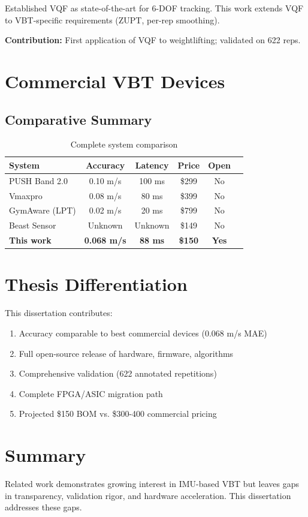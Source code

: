 Established VQF as state-of-the-art for 6-DOF tracking. This work extends VQF to VBT-specific requirements (ZUPT, per-rep smoothing).

\textbf{Contribution:} First application of VQF to weightlifting; validated on 622 reps.

\section{Commercial VBT Devices}

\subsection{Comparative Summary}

\begin{table}[h]
    \centering
    \caption{Complete system comparison}
    \label{tab:system_comparison}
    \begin{tabular}{lccccc}
        \toprule
        \textbf{System} & \textbf{Accuracy} & \textbf{Latency} & \textbf{Price} & \textbf{Open} \\
        \midrule
        PUSH Band 2.0 & 0.10 m/s & 100 ms & \$299 & No \\
        Vmaxpro & 0.08 m/s & 80 ms & \$399 & No \\
        GymAware (LPT) & 0.02 m/s & 20 ms & \$799 & No \\
        Beast Sensor & Unknown & Unknown & \$149 & No \\
        \midrule
        \textbf{This work} & \textbf{0.068 m/s} & \textbf{88 ms} & \textbf{\$150} & \textbf{Yes} \\
        \bottomrule
    \end{tabular}
\end{table}

\section{Thesis Differentiation}

This dissertation contributes:
\begin{enumerate}
    \item Accuracy comparable to best commercial devices (0.068 m/s MAE)
    \item Full open-source release of hardware, firmware, algorithms
    \item Comprehensive validation (622 annotated repetitions)
    \item Complete FPGA/ASIC migration path
    \item Projected \$150 BOM vs. \$300-400 commercial pricing
\end{enumerate}

\section{Summary}

Related work demonstrates growing interest in IMU-based VBT but leaves gaps in transparency, validation rigor, and hardware acceleration. This dissertation addresses these gaps.

\newpage